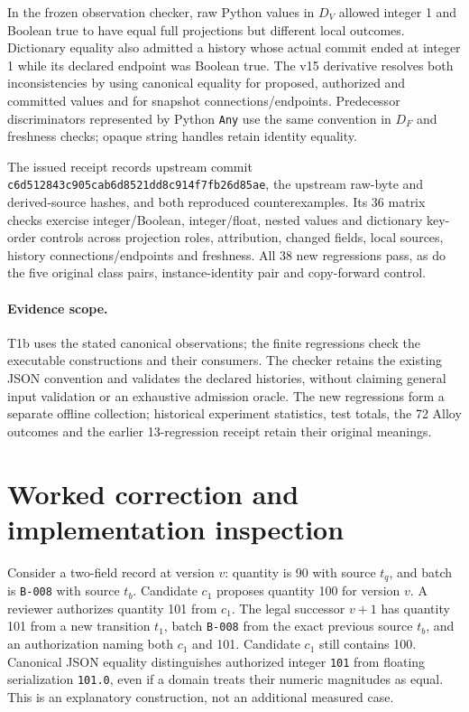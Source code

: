 \documentclass[11pt,a4paper]{article}
\newcommand{\code}[1]{\nolinkurl{#1}}
\begin{document}
In the frozen observation checker, raw Python values in $D_V$ allowed integer 1 and Boolean true to have equal full projections but different local outcomes. Dictionary equality also admitted a history whose actual commit ended at integer 1 while its declared endpoint was Boolean true. The v15 derivative resolves both inconsistencies by using canonical equality for proposed, authorized and committed values and for snapshot connections/endpoints. Predecessor discriminators represented by Python \code{Any} use the same convention in $D_F$ and freshness checks; opaque string handles retain identity equality.

The issued receipt records upstream commit \code{c6d512843c905cab6d8521dd8c914f7fb26d85ae}, the upstream raw-byte and derived-source hashes, and both reproduced counterexamples. Its 36 matrix checks exercise integer/Boolean, integer/float, nested values and dictionary key-order controls across projection roles, attribution, changed fields, local sources, history connections/endpoints and freshness. All 38 new regressions pass, as do the five original class pairs, instance-identity pair and copy-forward control.

\paragraph{Evidence scope.} T1b uses the stated canonical observations; the finite regressions check the executable constructions and their consumers. The checker retains the existing JSON convention and validates the declared histories, without claiming general input validation or an exhaustive admission oracle. The new regressions form a separate offline collection; historical experiment statistics, test totals, the 72 Alloy outcomes and the earlier 13-regression receipt retain their original meanings.

\section{Worked correction and implementation inspection}
\label{app:worked-example}

Consider a two-field record at version $v$: quantity is 90 with source $t_q$, and batch is \code{B-008} with source $t_b$. Candidate $c_1$ proposes quantity 100 for version $v$. A reviewer authorizes quantity 101 from $c_1$. The legal successor $v+1$ has quantity 101 from a new transition $t_1$, batch \code{B-008} from the exact previous source $t_b$, and an authorization naming both $c_1$ and 101. Candidate $c_1$ still contains 100. Canonical JSON equality distinguishes authorized integer \code{101} from floating serialization \code{101.0}, even if a domain treats their numeric magnitudes as equal. This is an explanatory construction, not an additional measured case.
\end{document}
